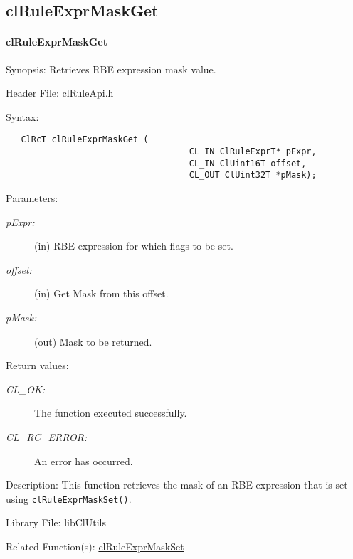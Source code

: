 \begin{flushleft}
\subsection{clRuleExprMaskGet}
\hypertarget{pagerule115}{}\paragraph{cl\-Rule\-Expr\-Mask\-Get}\label{pagerule115}
\begin{Desc}
\item[Synopsis:]Retrieves RBE expression mask value.\end{Desc}
\begin{Desc}
\item[Header File:]clRuleApi.h\end{Desc}
\begin{Desc}
\item[Syntax:]

\footnotesize\begin{verbatim}   ClRcT clRuleExprMaskGet (
                              		CL_IN ClRuleExprT* pExpr,
                              		CL_IN ClUint16T offset,
                              		CL_OUT ClUint32T *pMask);
\end{verbatim}
\normalsize
\end{Desc}
\begin{Desc}
\item[Parameters:]
\begin{description}
\item[{\em p\-Expr:}](in) RBE expression for which flags to be set. \item[{\em offset:}](in) Get Mask from this offset. 
\item[{\em p\-Mask:}](out) Mask to be returned.\end{description}
\end{Desc}
\begin{Desc}
\item[Return values:]
\begin{description}
\item[{\em CL\_\-OK:}]The function executed successfully. \item[{\em CL\_\-RC\_\-ERROR:}]An error has occurred.\end{description}
\end{Desc}
\begin{Desc}
\item[Description:]This function retrieves the mask of an RBE expression that is set using {\tt{clRuleExprMaskSet()}}.\end{Desc}
\begin{Desc}
\item[Library File:]lib\-Cl\-Utils\end{Desc}
\begin{Desc}
\item[Related Function(s):]\hyperlink{pagerule115}{cl\-Rule\-Expr\-Mask\-Set} \end{Desc}
\newpage


\end{flushleft}
